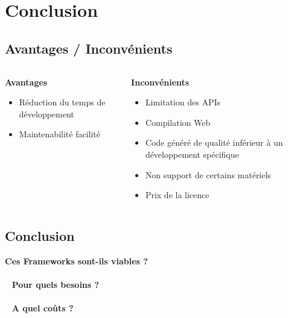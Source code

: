 \documentclass{beamer}
\begin{document}
\section{Conclusion}
\begin{frame}
\setcounter{tocdepth}{2}
\tableofcontents[currentsection]
\end{frame}


\subsection{Avantages / Inconvénients}
\begin{frame}
\begin{columns}[c]
  \begin{column}{0.5\textwidth}
    \textbf{Avantages}
    \begin{itemize}
      \item Réduction du temps de développement
      \item Maintenabilité facilité
    \end{itemize}
  \end{column}
  \begin{column}{0.5\textwidth}
    \textbf{Inconvénients}
    \begin{itemize}
      \item Limitation des APIs
      \item Compilation Web
      \item Code généré de qualité inférieur à un développement spécifique
      \item Non support de certains matériels
      \item Prix de la licence
    \end{itemize}
  \end{column}
\end{columns}
\end{frame}

\subsection{Conclusion}
\begin{frame}
\begin{center}
  \textbf{Ces Frameworks sont-ils viables ?}
  \\ ~ \\ ~
  \textbf{Pour quels besoins ?}
  \\ ~ \\ ~
  \textbf{A quel coûts ?}
\end{center}
\end{frame}
\end{document}
